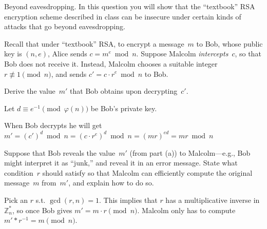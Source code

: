 \documentclass[12pt, letterpaper]{article}
\newcommand{\Z}{\mathbb{Z}}
\begin{document}
\begin{problem}{Beyond eavesdropping.}
    In this question you will show that the ``textbook'' RSA encryption scheme described in class can be insecure under certain kinds of attacks that go beyond eavesdropping.

  Recall that under ``textbook'' RSA, to encrypt a message~$m$ to Bob, whose public key is $(n,e)$, Alice sends $c = m^e \bmod{n}$.
  Suppose Malcolm \emph{intercepts}~$c$, so that Bob does not receive it.
  Instead, Malcolm chooses a suitable integer $r \not\equiv 1 \pmod{n}$, and sends $c' = c \cdot r^e \bmod{n}$ to Bob.
\end{problem}
\begin{subproblem}{}
    Derive the value~$m'$ that Bob obtains upon decrypting~$c'$.
\end{subproblem}
\begin{problemproof}
    Let $d \equiv e^{-1} \pmod{\varphi(n)}$ be Bob's private key.

    When Bob decrypts he will get $m'=(c')^d \bmod{n}=(c \cdot r^e)^d \bmod{n}=(mr)^{ed}=mr \bmod{n}$
\end{problemproof}

\begin{subproblem}{}
    Suppose that Bob reveals the value~$m'$ (from part (a)) to Malcolm---e.g., Bob might interpret it as ``junk,'' and reveal it in an error message.
    State what condition~$r$ should satisfy so that Malcolm can efficiently compute the original message~$m$ from~$m'$, and explain how to do so.
\end{subproblem}
\begin{problemproof}
    Pick an $r$ s.t. $\gcd(r,n)=1$. This implies that $r$ has a multiplicative inverse in $\Z^*_n$, so once Bob gives $m'=m \cdot r \pmod{n}$. Malcolm only has to compute $m'*r^{-1}=m \pmod{n}$.
\end{problemproof}
\end{document}
